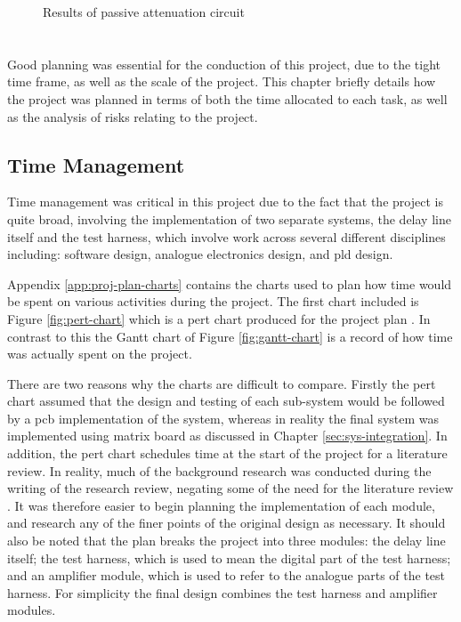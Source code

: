 \begin{figure}[ht]
	\centering
	\caption{Results of passive attenuation circuit}
	\label{fig:final-breakthrough}
\end{figure}

\chapter{} \label{sec:project-planning}
Good planning was essential for the conduction of this project, due to the tight time frame, as well as the scale of the project. This chapter briefly details how the project was planned in terms of both the time allocated to each task, as well as the analysis of risks relating to the project.


\section{Time Management}

Time management was critical in this project due to the fact that the project is quite broad, involving the implementation of two separate systems, the delay line itself and the test harness, which involve work across several different disciplines including: software design, analogue electronics design, and \gls{pld} design.

Appendix \ref{app:proj-plan-charts} contains the charts used to plan how time would be spent on various activities during the project. The first chart included is Figure \ref{fig:pert-chart} which is a \gls{pert} chart produced for the project plan \cite[p.3]{tyler2017b}. In contrast to this the Gantt chart of Figure \ref{fig:gantt-chart} is a record of how time was actually spent on the project.

There are two reasons why the charts are difficult to compare. Firstly the \gls{pert} chart assumed that the design and testing of each sub-system would be followed by a \gls{pcb} implementation of the system, whereas in reality the final system was implemented using matrix board as discussed in Chapter \ref{sec:sys-integration}. In addition, the \gls{pert} chart schedules time at the start of the project for a literature review. In reality, much of the background research was conducted during the writing of the research review, negating some of the need for the literature review \cite{tyler2017}. It was therefore easier to begin planning the implementation of each module, and research any of the finer points of the original design as necessary. It should also be noted that the plan breaks the project into three modules: the delay line itself; the test harness, which is used to mean the digital part of the test harness; and an amplifier module, which is used to refer to the analogue parts of the test harness. For simplicity the final design combines the test harness and amplifier modules.

